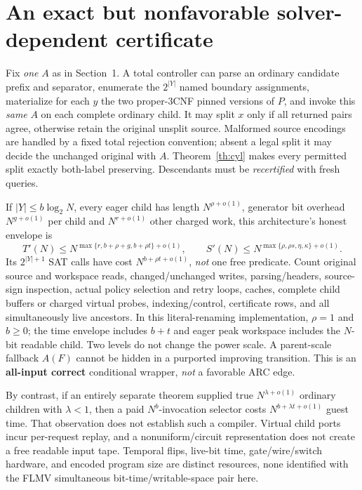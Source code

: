 \documentclass[11pt]{article}
\begin{document}
\section{An exact but nonfavorable solver-dependent certificate}
Fix \emph{one} \(A\) as in Section~1. A total controller can parse an
ordinary candidate prefix and separator, enumerate the \(2^{|Y|}\) named
boundary assignments, materialize for each \(y\) the two proper-3CNF
pinned versions of \(P\), and invoke this \emph{same} \(A\) on each
complete ordinary child. It may split \(x\) only if all returned pairs
agree, otherwise retain the original unsplit source. Malformed source
encodings are handled by a fixed total rejection convention; absent a
legal split it may decide the unchanged original with \(A\).
Theorem~\ref{th:cyl} makes every permitted split exactly both-label
preserving. Descendants must be \emph{recertified} with fresh queries.

If \(|Y|\le b\log_2N\), every eager child has length
\(N^{\rho+o(1)}\), generator bit overhead \(N^{g+o(1)}\) per child and
\(N^{r+o(1)}\) other charged work, this architecture's honest envelope
is
\[
 T'(N)\le N^{\max\{r,b+\rho+g,b+\rho t\}+o(1)},\qquad
 S'(N)\le N^{\max\{\rho,\rho s,\eta,\kappa\}+o(1)}. \tag{7}
\]
Its \(2^{|Y|+1}\) SAT calls have cost \(N^{b+\rho t+o(1)}\),
\emph{not} one free predicate. Count original source and workspace
reads, changed/unchanged writes, parsing/headers, source-sign
inspection, actual policy selection and retry loops, caches, complete
child buffers or charged virtual probes, indexing/control, certificate
rows, and all simultaneously live ancestors. In this literal-renaming
implementation, \(\rho=1\) and \(b\ge0\); the time envelope includes
\(b+t\) and eager peak workspace includes the \(N\)-bit readable child.
Two levels do not change the power scale. A parent-scale fallback \(A(F)\)
cannot be hidden in a purported improving transition. This is an
\textbf{all-input correct} conditional wrapper, \emph{not} a favorable
ARC edge.

By contrast, if an entirely separate theorem supplied true
\(N^{\lambda+o(1)}\) ordinary children with \(\lambda<1\),
then a paid \(N^b\)-invocation selector costs
\(N^{b+\lambda t+o(1)}\) guest time. That observation does not establish
such a compiler. Virtual child ports incur per-request replay, and a
nonuniform/circuit representation does not create a free readable
input tape. Temporal flips, live-bit time, gate/wire/switch hardware,
and encoded program size are distinct resources, none identified
with the FLMV simultaneous bit-time/writable-space pair here.
\end{document}
